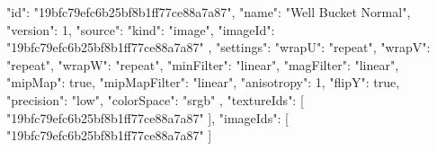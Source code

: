 {
  "id": "19bfc79efc6b25bf8b1ff77ce88a7a87",
  "name": "Well Bucket Normal",
  "version": 1,
  "source": {
    "kind": "image",
    "imageId": "19bfc79efc6b25bf8b1ff77ce88a7a87"
  },
  "settings": {
    "wrapU": "repeat",
    "wrapV": "repeat",
    "wrapW": "repeat",
    "minFilter": "linear",
    "magFilter": "linear",
    "mipMap": true,
    "mipMapFilter": "linear",
    "anisotropy": 1,
    "flipY": true,
    "precision": "low",
    "colorSpace": "srgb"
  },
  "textureIds": [
    "19bfc79efc6b25bf8b1ff77ce88a7a87"
  ],
  "imageIds": [
    "19bfc79efc6b25bf8b1ff77ce88a7a87"
  ]
}
